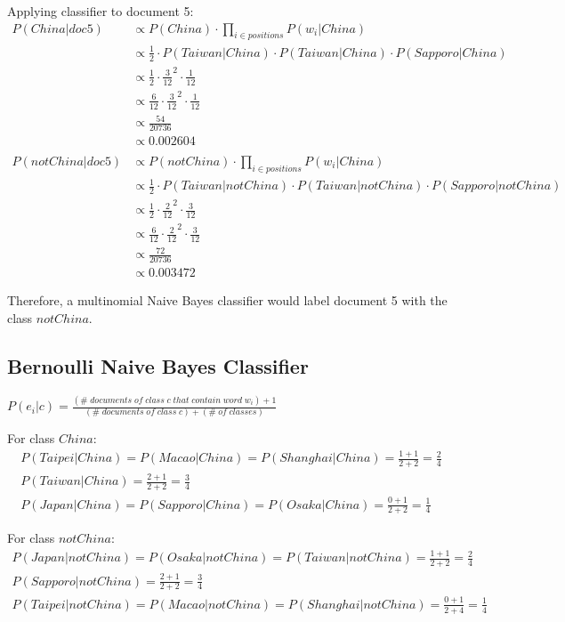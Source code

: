 \documentclass{article}
\begin{document}
Applying classifier to document 5:
\begin{align}
	P(China|doc5) & \propto P(China) \cdot \prod_{i \in positions} {P(w_i|China)} \\
	& \propto \frac{1}{2} \cdot P(Taiwan|China) \cdot P(Taiwan|China) \cdot P(Sapporo|China) \\
	& \propto \frac{1}{2} \cdot \frac{3}{12}^2 \cdot \frac{1}{12} \\
	& \propto \frac{6}{12} \cdot \frac{3}{12}^2 \cdot \frac{1}{12} \\
	& \propto \frac{54}{20736} \\
	& \propto 0.002604 \\
	& \nonumber \\ 
	P(notChina|doc5) & \propto P(notChina) \cdot \prod_{i \in positions} {P(w_i|China)} \\
	& \propto \frac{1}{2} \cdot P(Taiwan|notChina) \cdot P(Taiwan|notChina) \cdot P(Sapporo|notChina) \\
	& \propto \frac{1}{2} \cdot \frac{2}{12}^2 \cdot \frac{3}{12} \\
	& \propto \frac{6}{12} \cdot \frac{2}{12}^2 \cdot \frac{3}{12} \\	
	& \propto \frac{72}{20736} \\
	& \propto 0.003472
\end{align}

Therefore, a multinomial Naive Bayes classifier would label document 5 with the class $notChina$.

\subsection{Bernoulli Naive Bayes Classifier}

$P(e_i|c) = \frac{(\#\;documents\;of\;class\;c\;that\;contain\;word\;w_i) + 1}{(\#\;documents\;of\;class\;c) + (\#\;of\;classes)}$

For class $China$:
\begin{align}
P(Taipei|China) = P(Macao|China) = P(Shanghai|China) = \frac{1 + 1}{2 + 2} = \frac{2}{4} \\
P(Taiwan|China) = \frac{2 + 1}{2 + 2} = \frac{3}{4} \\
P(Japan|China) = P(Sapporo|China) = P(Osaka|China) = \frac{0 + 1}{2 + 2} = \frac{1}{4}
\end{align}

For class $notChina$:
\begin{align}
P(Japan|notChina) = P(Osaka|notChina) = P(Taiwan|notChina) = \frac{1 + 1}{2 + 2} = \frac{2}{4} \\
P(Sapporo|notChina) = \frac{2 + 1}{2 + 2} = \frac{3}{4} \\
P(Taipei|notChina) = P(Macao|notChina) = P(Shanghai|notChina) = \frac{0 + 1}{2 + 4} = \frac{1}{4}
\end{align}
\end{document}
